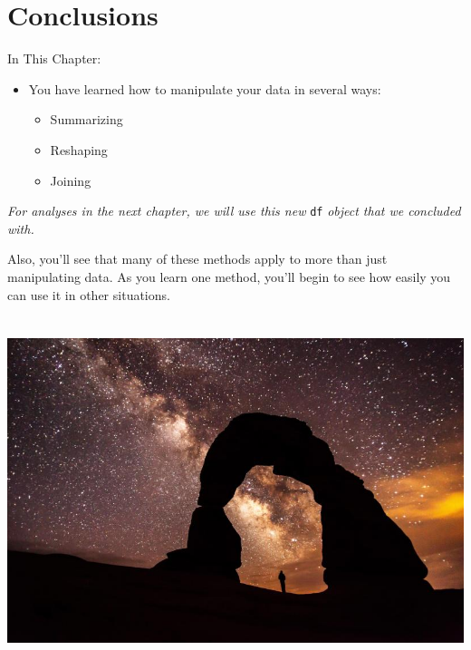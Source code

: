 \documentclass[ignorenonframetext,]{beamer}
\providecommand{\tightlist}{%
\setlength{\itemsep}{0pt}\setlength{\parskip}{0pt}}
\begin{document}
\section{Conclusions}\label{conclusions}

\begin{frame}[fragile]{In This Chapter:}

\begin{itemize}
\tightlist
\item
  You have learned how to manipulate your data in several ways:

  \begin{itemize}
  \tightlist
  \item
    Summarizing
  \item
    Reshaping
  \item
    Joining
  \end{itemize}
\end{itemize}

\emph{For analyses in the next chapter, we will use this new}
\texttt{df} \emph{object that we concluded with.}

Also, you'll see that many of these methods apply to more than just
manipulating data. As you learn one method, you'll begin to see how
easily you can use it in other situations.

\end{frame}

\begin{frame}

\centerline{\includegraphics[height=4in]{Figures/delicate_arch.jpg}}

\end{frame}
\end{document}

